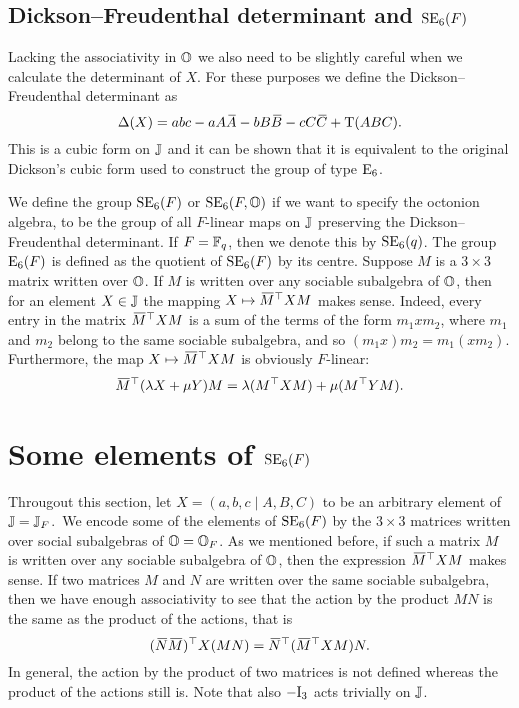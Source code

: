 \subsection{Dickson--Freudenthal determinant and $\mathrm{SE}_6(F)$}

Lacking the associativity in $\mathbb{O}$ we also need to be slightly careful when we calculate
the determinant of $X$. For these purposes we define the Dickson--Freudenthal determinant
as
\begin{equation}
	\fdet(X) = abc - aA\ovA - bB\ovB - cC\ovC + \Tr(ABC).
\end{equation}
This is a cubic form on $\mathbb{J}$ and it can be shown that it is equivalent to the 
original Dickson's cubic form \cite{Dickson1} used to construct the group of type $\mathrm{E}_6$. 

We define the group $\mathrm{SE}_6(F)$ or $\mathrm{SE}_6(F,\mathbb{O})$ if we want to specify the octonion 
algebra, to be the group of all $F$-linear maps on $\mathbb{J}$ preserving
 the Dickson--Freudenthal determinant. If $F = \mathbb{F}_q$, then we denote this by $\mathrm{SE}_6(q)$.
  The group $\mathord{\mathrm{E}}_6(F)$ is defined as the quotient
 of $\mathrm{SE}_6(F)$ by its centre.
Suppose $M$ is a $3\times 3$ matrix written over $\mathbb{O}$. If $M$ is written over any 
sociable subalgebra of $\mathbb{O}$, then for an element $X \in \mathbb{J}$ the mapping 
$X \mapsto \mathord{\mbox{\hspace*{0pt}}\,\overline{\!M\!\!\;}\!\:}\mbox{\hspace*{0pt}}^{\top} X M$ makes sense. Indeed, every entry in the matrix $\mathord{\mbox{\hspace*{0pt}}\,\overline{\!M\!\!\;}\!\:}\mbox{\hspace*{0pt}}^{\top} X M$
is a sum of the terms of the form $m_1 x m_2$, where $m_1$ and $m_2$ belong to the same
sociable subalgebra, and so $(m_1 x) m_2 = m_1 (x m_2)$. Furthermore, the map
$X \mapsto \mathord{\mbox{\hspace*{0pt}}\,\overline{\!M\!\!\;}\!\:}\mbox{\hspace*{0pt}}^{\top} X M$ is obviously $F$-linear:
\begin{equation*}
	\mathord{\mbox{\hspace*{0pt}}\,\overline{\!M\!\!\;}\!\:}\mbox{\hspace*{0pt}}^{\top} (\lambda X + \mu Y) M = \lambda (  M^{\top} X M ) + \mu ( M^{\top} Y M ).
\end{equation*}

\section{Some elements of $\mathrm{SE}_6(F)$}
\label{section:elts_E6}

Througout this section, let $X = (a,b,c\mid A,B,C)$ to be an arbitrary element of 
$\mathbb{J} = \mathbb{J}_F$.\ We encode some of the elements of $\mathrm{SE}_6(F)$ by the $3\times 3$
 matrices written over
social subalgebras of $\mathbb{O}=\mathbb{O}_{F}$. As we mentioned before, if such a matrix $M$ is written
over any sociable subalgebra of $\mathbb{O}$, then the expression $\mathord{\mbox{\hspace*{0pt}}\,\overline{\!M\!\!\;}\!\:}\mbox{\hspace*{0pt}}^{\top} X M$ makes sense.
If two matrices $M$ and $N$ are written over the same sociable subalgebra, then we have 
enough associativity to see that the action by the product $MN$ is the same as the product
of the actions, that is
\begin{equation}
	(\ovN \ovM)^{\T} X (MN) = \ovN^{\T} (\ovM^{\T} X M) N.
\end{equation} 
In general, the action by the product of two matrices is not defined whereas the product 
of the actions still is. Note that also $-\mathord{\mathrm{I}}_3$ acts trivially on $\mathbb{J}$. 

